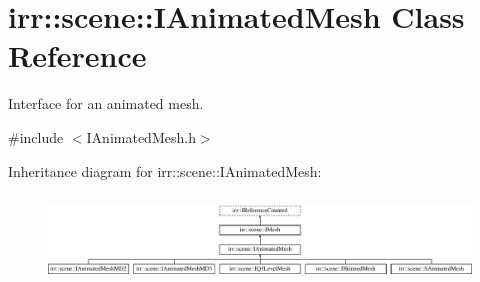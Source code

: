 \hypertarget{classirr_1_1scene_1_1IAnimatedMesh}{}\section{irr\+:\+:scene\+:\+:I\+Animated\+Mesh Class Reference}
\label{classirr_1_1scene_1_1IAnimatedMesh}


Interface for an animated mesh.  




{\ttfamily \#include $<$I\+Animated\+Mesh.\+h$>$}

Inheritance diagram for irr\+:\+:scene\+:\+:I\+Animated\+Mesh\+:\begin{figure}[H]
\begin{center}
\leavevmode
\includegraphics[height=2.333333cm]{classirr_1_1scene_1_1IAnimatedMesh}
\end{center}
\end{figure}
